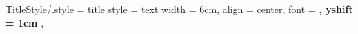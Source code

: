 
\pgfplotsset
{
	TitleStyle/.style =
	{
		title style		=
		{
			text width	= 6cm,
			align		= center,
			font		= \bf,
			yshift		= 1cm
		},
	}
}

